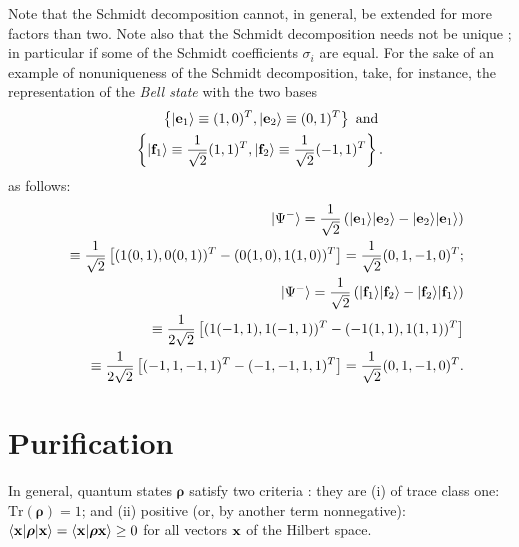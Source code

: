 Note that the Schmidt decomposition cannot, in general, be extended for more factors than two.
Note also that the Schmidt decomposition needs not be unique \cite{ekert:415};
in particular if some of the Schmidt coefficients $\sigma_i$ are equal.
For the sake of an example of nonuniqueness of the Schmidt decomposition,
take, for instance, the representation of the {\em Bell state} 
with the two bases
\begin{equation}
\begin{split}
\left\{
\vert {\bf e}_1\rangle \equiv (1,0)^T,
\vert {\bf e}_2\rangle \equiv (0,1)^T
\right\}
\textrm{ and }\\
\left\{
\vert {\bf f}_1\rangle \equiv \frac{1}{\sqrt{2}}(1,1)^T,
\vert {\bf f}_2\rangle \equiv \frac{1}{\sqrt{2}}(-1,1)^T
\right\}.
\end{split}
\end{equation}
as follows:
\begin{equation}
\begin{split}
\vert {\Psi^-} \rangle =
\frac{1}{\sqrt{2}}
\left(
\vert {\bf e}_1\rangle
\vert {\bf e}_2\rangle
-
\vert {\bf e}_2\rangle
\vert {\bf e}_1\rangle
\right)\\
\quad \equiv
\frac{1}{\sqrt{2}}
\left[
(1 (0,1),0(0,1))^T- (0 (1,0),1(1,0))^T\right] = \frac{1}{\sqrt{2}} (0,1,-1,0)^T; \\
\vert {\Psi^-} \rangle =
\frac{1}{\sqrt{2}}
\left(
\vert {\bf f}_1\rangle
\vert {\bf f}_2\rangle
-
\vert {\bf f}_2\rangle
\vert {\bf f}_1\rangle
\right) \\
\quad \equiv
\frac{1}{2\sqrt{2}}
\left[
(1 (-1,1),1(-1,1))^T- ( -1 (1,1),1(1,1))^T\right]  \\
\quad \equiv
\frac{1}{2\sqrt{2}}
\left[
( -1  , 1 ,-1 ,1 )^T - ( -1,-1 ,1 ,1 )^T\right]
 = \frac{1}{\sqrt{2}} (0,1,-1,0)^T
.
\end{split}
\end{equation}



\section{Purification}
\label{2015-m-ch-fdvs-purification}


In general, quantum states ${\boldsymbol{\rho}}$ satisfy two criteria \cite{ba-89}:  they are
(i) of trace class one:
$\textrm{Tr}({\boldsymbol{\rho}}) =1$;
and
(ii) positive (or, by another term nonnegative):
$
\langle {\bf x} \vert {\boldsymbol{\rho}} \vert {\bf x} \rangle
=\langle {\bf x} \vert {\boldsymbol{\rho}}  {\bf x} \rangle \ge  0
$ for all vectors ${\bf x}$ of the  Hilbert space.

